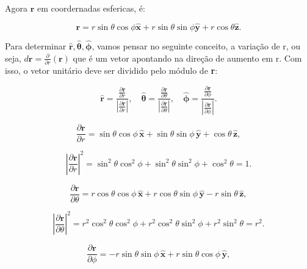 \documentclass[a4paper,12pt]{article}
\begin{document}
Agora $\mathbf{r}$ em coordernadas esfericas, \'e:

\begin{equation}\label{eq:r_xyz}
    \mathbf{r} = r\sin{\theta}\cos{\phi} \hat{\mathbf{x}} + r\sin{\theta}\sin{\phi} \hat{\mathbf{y}} + r\cos{\theta} \hat{\mathbf{z}}.
\end{equation}

Para determinar \( \hat{\mathbf{r}}, \hat{\bm{\theta}}, \hat{\bm{\phi}} \), vamos pensar no seguinte conceito, a varia\c{c}\~ao
de r, ou seja, $d\textbf{r} = \frac{\partial}{\partial r}(\textbf{r})$ que \'e um vetor apontando na dire\c{c}\~ao de aumento em r. Com isso,
o vetor unit\'ario deve ser dividido pelo m\'odulo de \textbf{r}:

\begin{equation}
\hat{\mathbf{r}} = \frac{\frac{\partial \mathbf{r}}{\partial r}}{\left| \frac{\partial \mathbf{r}}{\partial r} \right|}, \quad
\hat{\bm{\theta}} = \frac{\frac{\partial \mathbf{r}}{\partial \theta}}{\left| \frac{\partial \mathbf{r}}{\partial \theta} \right|}, \quad
\hat{\bm{\phi}} = \frac{\frac{\partial \mathbf{r}}{\partial \phi}}{\left| \frac{\partial \mathbf{r}}{\partial \phi} \right|}.
\end{equation}

\begin{equation}
\frac{\partial \mathbf{r}}{\partial r} = \sin\theta \cos\phi \, \hat{\mathbf{x}} + \sin\theta \sin\phi \, \hat{\mathbf{y}} + \cos\theta \, \hat{\mathbf{z}},
\end{equation}

\begin{equation}
\left| \frac{\partial \mathbf{r}}{\partial r} \right|^2 = \sin^2\theta \cos^2\phi + \sin^2\theta \sin^2\phi + \cos^2\theta = 1.
\end{equation}

\begin{equation}
\frac{\partial \mathbf{r}}{\partial \theta} = r \cos\theta \cos\phi \, \hat{\mathbf{x}} + r \cos\theta \sin\phi \, \hat{\mathbf{y}} - r \sin\theta \, \hat{\mathbf{z}},
\end{equation}

\begin{equation}
\left| \frac{\partial \mathbf{r}}{\partial \theta} \right|^2 = r^2 \cos^2\theta \cos^2\phi + r^2 \cos^2\theta \sin^2\phi + r^2 \sin^2\theta = r^2.
\end{equation}

\begin{equation}
\frac{\partial \mathbf{r}}{\partial \phi} = -r \sin\theta \sin\phi \, \hat{\mathbf{x}} + r \sin\theta \cos\phi \, \hat{\mathbf{y}},
\end{equation}
\end{document}
